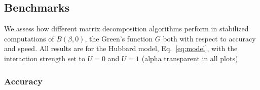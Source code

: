 \documentclass[submission, Phys]{SciPost}
\newcommand{\ssmall}{\scalebox{0.9}{s}}
\newcommand{\smedium}{\scalebox{1.3}{s}}
\newcommand{\slarge}{\scalebox{1.7}{s}}
\begin{document}

\subsection{Benchmarks}\label{sec:benchmarks}

We assess how different matrix decomposition algorithms perform in stabilized computations of $B(\beta, 0)$, the Green's function $G$ both with respect to accuracy and speed. All results are for the Hubbard model, Eq.~\ref{eq:model}, with the interaction strength set to $U=0$ and $U=1$ (alpha transparent in all plots)

\subsubsection{Accuracy}
\end{document}
